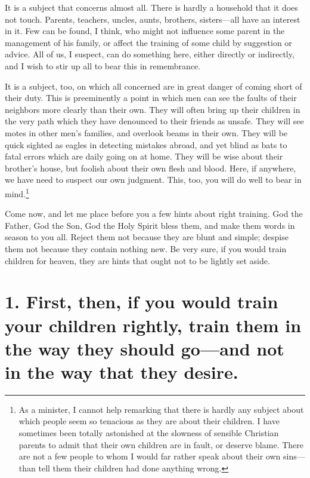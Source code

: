 \documentclass[
]{book}
\begin{document}
It is a subject that concerns almost all. There is hardly a household that it does not touch. Parents, teachers, uncles, aunts, brothers, sisters---all have an interest in it. Few can be found, I think, who might not influence some parent in the management of his family, or affect the training of some child by suggestion or advice. All of us, I suspect, can do something here, either directly or indirectly, and I wish to stir up all to bear this in remembrance.

It is a subject, too, on which all concerned are in great danger of coming short of their duty. This is preeminently a point in which men can see the faults of their neighbors more clearly than their own. They will often bring up their children in the very path which they have denounced to their friends as unsafe. They will see motes in other men's families, and overlook beams in their own. They will be quick sighted as eagles in detecting mistakes abroad, and yet blind as bats to fatal errors which are daily going on at home. They will be wise about their brother's house, but foolish about their own flesh and blood. Here, if anywhere, we have need to suspect our own judgment. This, too, you will do well to bear in mind.\footnote{As a minister, I cannot help remarking that there is hardly any subject about which people seem so tenacious as they are about their children. I have sometimes been totally astonished at the slowness of sensible Christian parents to admit that their own children are in fault, or deserve blame. There are not a few people to whom I would far rather speak about their own sins---than tell them their children had done anything wrong.}

Come now, and let me place before you a few hints about right training. God the Father, God the Son, God the Holy Spirit bless them, and make them words in season to you all. Reject them not because they are blunt and simple; despise them not because they contain nothing new. Be very sure, if you would train children for heaven, they are hints that ought not to be lightly set aside.

\hypertarget{first-then-if-you-would-train-your-children-rightly-train-them-in-the-way-they-should-goand-not-in-the-way-that-they-desire.}{%
\section*{1. First, then, if you would train your children rightly, train them in the way they should go---and not in the way that they desire.}\label{first-then-if-you-would-train-your-children-rightly-train-them-in-the-way-they-should-goand-not-in-the-way-that-they-desire.}}
\end{document}
